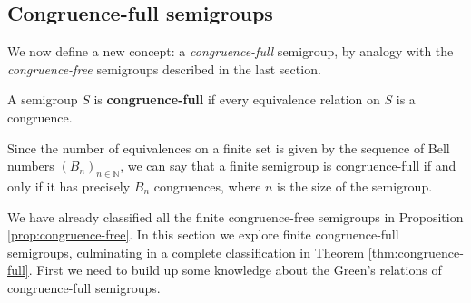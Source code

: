 \subsection{Congruence-full semigroups}
\label{sec:congruence-full}

We now define a new concept: a \textit{congruence-full} semigroup, by analogy
with the \textit{congruence-free} semigroups described in the last section.

\begin{definition}
  A semigroup $S$ is \textbf{congruence-full} if every equivalence relation on
  $S$ is a congruence.
\end{definition}

Since the number of equivalences on a finite set is given by the sequence of
Bell numbers $(B_n)_{n \in \mathbb{N}}$, we can say that a finite semigroup is
congruence-full if and only if it has precisely $B_n$ congruences, where $n$ is
the size of the semigroup.

We have already classified all the finite congruence-free semigroups in
Proposition \ref{prop:congruence-free}.
In this section we explore finite congruence-full semigroups, culminating in a
complete classification in Theorem \ref{thm:congruence-full}.  First we need to
build up some knowledge about the Green's relations of congruence-full
semigroups.

